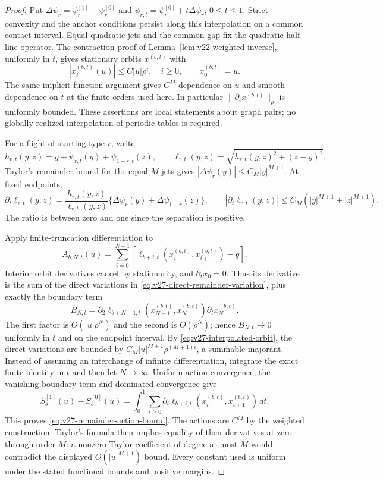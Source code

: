 \begin{proof}
Put $\Delta\psi_r=\psi_r^{[1]}-\psi_r^{[0]}$ and
$\psi_{r,t}=\psi_r^{[0]}+t\Delta\psi_r$, $0\le t\le1$.
Strict convexity and the anchor conditions persist along this interpolation
on a common contact interval.  Equal quadratic jets and the common gap
fix the quadratic half-line operator.  The contraction proof of
Lemma~\ref{lem:v22-weighted-inverse}, uniformly in $t$, gives stationary
orbits $x^{(b,t)}$ with
\begin{equation}\label{eq:v27-interpolated-orbit}
 |x_i^{(b,t)}(u)|\le C|u|\rho^i,\quad i\ge0,
 \qquad x_0^{(b,t)}=u.
\end{equation}
The same implicit-function argument gives $C^M$ dependence on $u$ and
smooth dependence on $t$ at the finite orders used here.  In particular
$\|\partial_t x^{(b,t)}\|_\rho$ is uniformly bounded.  These assertions
are local statements about graph pairs; no globally realized interpolation
of periodic tables is required.

For a flight of starting type $r$, write
\[
 h_{r,t}(y,z)=g+\psi_{r,t}(y)+\psi_{1-r,t}(z),\qquad
 \ell_{r,t}(y,z)=\sqrt{h_{r,t}(y,z)^2+(z-y)^2}.
\]
Taylor's remainder bound for the equal $M$-jets gives
$|\Delta\psi_r(y)|\le C_M|y|^{M+1}$.  At fixed endpoints,
\begin{equation}\label{eq:v27-direct-remainder-variation}
 \partial_t\ell_{r,t}(y,z)
 =\frac{h_{r,t}(y,z)}{\ell_{r,t}(y,z)}
                 \{\Delta\psi_r(y)+\Delta\psi_{1-r}(z)\},
 \qquad
 |\partial_t\ell_{r,t}(y,z)|
 \le C_M(|y|^{M+1}+|z|^{M+1}).
\end{equation}
The ratio is between zero and one since the separation is positive.

Apply finite-truncation differentiation to
\[
 A_{b,N,t}(u)=\sum_{i=0}^{N-1}
       [\ell_{b+i,t}(x_i^{(b,t)},x_{i+1}^{(b,t)})-g].
\]
Interior orbit derivatives cancel by stationarity, and $\partial_t x_0=0$.
Thus its derivative is the sum of the direct variations in
\eqref{eq:v27-direct-remainder-variation}, plus exactly the boundary term
\[
 B_{N,t}=\partial_2\ell_{b+N-1,t}(x_{N-1}^{(b,t)},x_N^{(b,t)})
                                         \partial_t x_N^{(b,t)}.
\]
The first factor is $O(|u|\rho^N)$ and the second is $O(\rho^N)$;
hence $B_{N,t}\to0$ uniformly in $t$ and on the endpoint interval.
By \eqref{eq:v27-interpolated-orbit}, the direct variations are bounded
by $C_M|u|^{M+1}\rho^{(M+1)i}$, a summable majorant.  Instead of
assuming an interchange of infinite differentiation, integrate the exact
finite identity in $t$ and then let $N\to\infty$.  Uniform action
convergence, the vanishing boundary term and dominated convergence give
\[
 S_b^{[1]}(u)-S_b^{[0]}(u)
 =\int_0^1\sum_{i\ge0}
    \partial_t\ell_{b+i,t}(x_i^{(b,t)},x_{i+1}^{(b,t)})\,dt.
\]
This proves \eqref{eq:v27-remainder-action-bound}.  The actions are $C^M$
by the weighted construction.  Taylor's formula then implies equality
of their derivatives at zero through order $M$: a nonzero Taylor
coefficient of degree at most $M$ would contradict the displayed
$O(|u|^{M+1})$ bound.  Every constant used is uniform under the stated
functional bounds and positive margins.
\end{proof}

